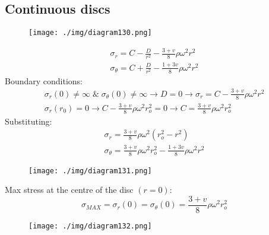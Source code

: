 \subsection{Continuous discs}
\begin{figure}[H]
    \centering
    \texttt{[image: ./img/diagram130.png]}
    \caption{}
\end{figure}
\begin{gather}
    \sigma_r = C - \frac{D}{r^2} - \frac{3 + v}{8}\rho \omega^2 r^2\\
    \sigma_{\theta} = C + \frac{D}{r^2} - \frac{1+ 3v}{8}\rho\omega^2 r^2
\end{gather}
Boundary conditions:
\begin{gather}
    \sigma_r (0) \neq \infty \; \& \; \sigma_{\theta} (0) \neq \infty \rightarrow D = 0 \rightarrow \sigma_r = C - \frac{3+v}{8} \rho \omega^2 r^2\\
    \sigma_r \left(r_0\right) = 0 \rightarrow C - \frac{3+v}{8} \rho \omega^2 r^2_o = 0 \rightarrow C = \frac{3+v}{8}\rho \omega^2 r^2_o
\end{gather}
Substituting:
\begin{gather}
    \sigma_r = \frac{3+v}{8} \rho \omega^2 \left(r_o^2 - r^2\right)\\
    \sigma_{\theta} = \frac{3+v}{8}\rho \omega^2 r_o^2 - \frac{1+3v}{8} \rho \omega^2 r^2
\end{gather}
\begin{figure}[H]
    \centering
    \texttt{[image: ./img/diagram131.png]}
    \caption{}
\end{figure}
Max stress at the centre of the disc $(r=0)$:
\begin{equation}
    \sigma_{MAX} = \sigma_r (0) = \sigma_{\theta} (0) = \frac{3+v}{8}\rho \omega^2 r^2_o
\end{equation}
\begin{figure}[H]
    \centering
    \texttt{[image: ./img/diagram132.png]}
    \caption{}
\end{figure}

